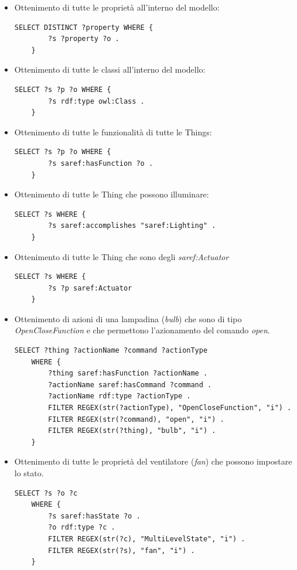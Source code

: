 \documentclass[12pt,a4paper,openright,oneside]{report}
\begin{document}
\begin{itemize}
	\item Ottenimento di tutte le proprietà all'interno del modello:
	\begin{lstlisting}[language=XML]
	SELECT DISTINCT ?property WHERE {
		?s ?property ?o .
	}
	\end{lstlisting}

	\item Ottenimento di tutte le classi all'interno del modello:
	\begin{lstlisting}[language=XML]
	SELECT ?s ?p ?o WHERE {
		?s rdf:type owl:Class .
	}
	\end{lstlisting}

	\item Ottenimento di tutte le funzionalità di tutte le Things:
	\begin{lstlisting}[language=XML]
	SELECT ?s ?p ?o WHERE {
		?s saref:hasFunction ?o .
	}
	\end{lstlisting}

	\item Ottenimento di tutte le Thing che possono illuminare:
	\begin{lstlisting}[language=XML]
	SELECT ?s WHERE {
		?s saref:accomplishes "saref:Lighting" .
	}
	\end{lstlisting}

	\item Ottenimento di tutte le Thing che sono degli \textit{saref:Actuator}
	\begin{lstlisting}[language=XML]
	SELECT ?s WHERE { 
		?s ?p saref:Actuator
	}
	\end{lstlisting}

	\item Ottenimento di azioni di una lampadina (\textit{bulb}) che sono di tipo \textit{OpenCloseFunction} e che permettono l'azionamento del comando \textit{open}.
	\begin{lstlisting}[language=XML]
    SELECT ?thing ?actionName ?command ?actionType
	WHERE {
		?thing saref:hasFunction ?actionName .
		?actionName saref:hasCommand ?command .
		?actionName rdf:type ?actionType .
		FILTER REGEX(str(?actionType), "OpenCloseFunction", "i") .
		FILTER REGEX(str(?command), "open", "i") .
		FILTER REGEX(str(?thing), "bulb", "i") .
	}
	\end{lstlisting}

	\item Ottenimento di tutte le proprietà del ventilatore (\textit{fan}) che possono impostare lo stato.
	\begin{lstlisting}[language=XML]
    SELECT ?s ?o ?c
	WHERE {
		?s saref:hasState ?o .
		?o rdf:type ?c .
		FILTER REGEX(str(?c), "MultiLevelState", "i") .
		FILTER REGEX(str(?s), "fan", "i") .
	}
	\end{lstlisting}
\end{itemize}
\end{document}

